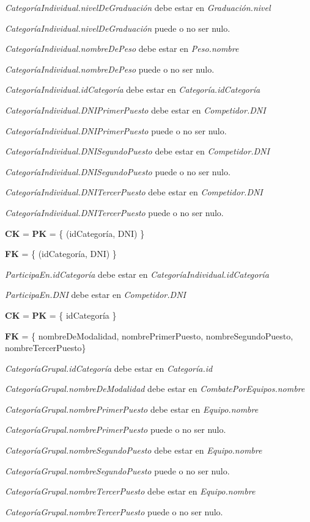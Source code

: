 \textit{CategoríaIndividual.nivelDeGraduación} debe estar en \textit{Graduación.nivel}

\textit{CategoríaIndividual.nivelDeGraduación} puede o no ser nulo.

\textit{CategoríaIndividual.nombreDePeso} debe estar en \textit{Peso.nombre}

\textit{CategoríaIndividual.nombreDePeso} puede o no ser nulo. 

\textit{CategoríaIndividual.idCategoría} debe estar en \textit{Categoría.idCategoría}

\textit{CategoríaIndividual.DNIPrimerPuesto} debe estar en \textit{Competidor.DNI}

\textit{CategoríaIndividual.DNIPrimerPuesto} puede o no ser nulo.

\textit{CategoríaIndividual.DNISegundoPuesto} debe estar en \textit{Competidor.DNI}

\textit{CategoríaIndividual.DNISegundoPuesto} puede o no ser nulo.

\textit{CategoríaIndividual.DNITercerPuesto} debe estar en \textit{Competidor.DNI}

\textit{CategoríaIndividual.DNITercerPuesto} puede o no ser nulo. \\


\textbf{CK} = \textbf{PK} = \{ (idCategor\'ia, DNI) \}

\textbf{FK} = \{ (idCategor\'ia, DNI) \}

\textit{ParticipaEn.idCategoría} debe estar en \textit{CategoríaIndividual.idCategoría}

\textit{ParticipaEn.DNI} debe estar en \textit{Competidor.DNI}\\


\textbf{CK} = \textbf{PK} = \{ idCategor\'ia \}

\textbf{FK} = \{ nombreDeModalidad,  nombrePrimerPuesto, nombreSegundoPuesto, nombreTercerPuesto\}

\textit{CategoríaGrupal.idCategoría} debe estar en \textit{Categoría.id}

\textit{CategoríaGrupal.nombreDeModalidad} debe estar en \textit{CombatePorEquipos.nombre}

\textit{CategoríaGrupal.nombrePrimerPuesto} debe estar en \textit{Equipo.nombre}

\textit{CategoríaGrupal.nombrePrimerPuesto} puede o no ser nulo.

\textit{CategoríaGrupal.nombreSegundoPuesto} debe estar en \textit{Equipo.nombre}

\textit{CategoríaGrupal.nombreSegundoPuesto} puede o no ser nulo.

\textit{CategoríaGrupal.nombreTercerPuesto} debe estar en \textit{Equipo.nombre}

\textit{CategoríaGrupal.nombreTercerPuesto} puede o no ser nulo.